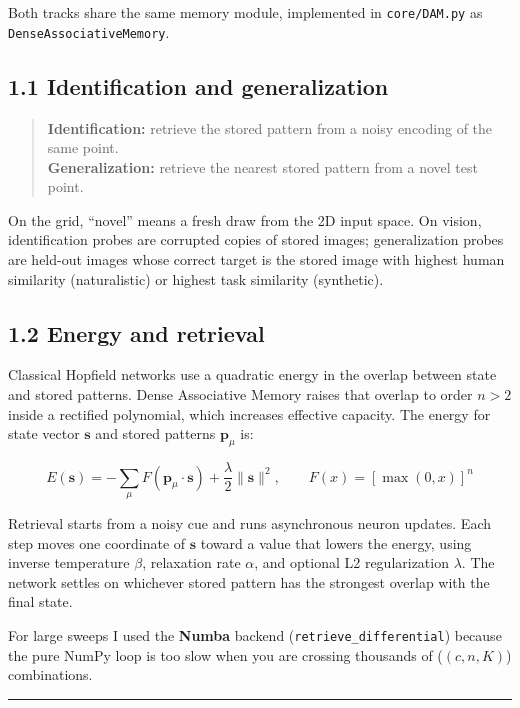 \documentclass[
  11pt,
]{memoir}
\begin{document}
Both tracks share the same memory module, implemented in
\texttt{core/DAM.py} as \texttt{DenseAssociativeMemory}.

\subsection{1.1 Identification and
generalization}\label{identification-and-generalization}

\begin{quote}
\textbf{Identification:} retrieve the stored pattern from a noisy
encoding of the same point.\\
\textbf{Generalization:} retrieve the nearest stored pattern from a
novel test point.
\end{quote}

On the grid, ``novel'' means a fresh draw from the 2D input space. On
vision, identification probes are corrupted copies of stored images;
generalization probes are held-out images whose correct target is the
stored image with highest human similarity (naturalistic) or highest
task similarity (synthetic).

\subsection{1.2 Energy and retrieval}\label{energy-and-retrieval}

Classical Hopfield networks use a quadratic energy in the overlap
between state and stored patterns. Dense Associative Memory raises that
overlap to order $n > 2$ inside a rectified polynomial,
which increases effective capacity. The energy for state vector
$\mathbf{s}$ and stored patterns $\mathbf{p}_{\mu}$ is:

\[
E(\mathbf{s}) = -\sum_{\mu} F(\mathbf{p}_\mu \cdot \mathbf{s}) + \frac{\lambda}{2}\|\mathbf{s}\|^2, \qquad F(x) = [\max(0, x)]^n
\]

Retrieval starts from a noisy cue and runs asynchronous neuron updates.
Each step moves one coordinate of $\mathbf{s}$ toward a value that
lowers the energy, using inverse temperature $\beta$, relaxation rate
$\alpha$, and optional L2 regularization $\lambda$. The network settles
on whichever stored pattern has the strongest overlap with the final
state.

For large sweeps I used the \textbf{Numba} backend
(\texttt{retrieve\_differential}) because the pure NumPy loop is too
slow when you are crossing thousands of ($(c, n, K)$) combinations.

\begin{center}\rule{0.5\linewidth}{0.5pt}\end{center}
\end{document}
